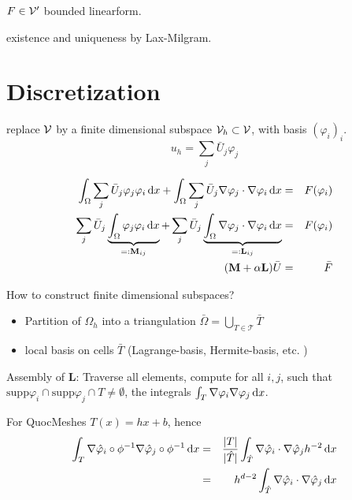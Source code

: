 $F\in {\mathcal V}'$ bounded linearform.

existence and uniqueness by Lax-Milgram.

\section{Discretization}

replace ${\mathcal V}$ by a finite dimensional subspace ${\mathcal V}_h \subset {\mathcal V}$, with basis $(\varphi_i)_i$.
\begin{equation}
u_h = \sum_j \bar U_j \varphi_j
\end{equation}

\begin{eqnarray*}
\int_\Omega \sum_j \bar U_j \varphi_j \varphi_i \,\mathrm{d}x + \int_\Omega\sum_j \bar U_j \nabla \varphi_j \cdot \nabla \varphi_i \,\mathrm{d}x  & = & F(\varphi_i)  \\
 \sum_j \bar U_j \underbrace{\int_\Omega \varphi_j \varphi_i \,\mathrm{d}x}_{=: \mathbf{M}_{ij}} + \sum_j \bar U_j \underbrace{\int_\Omega\nabla \varphi_j \cdot \nabla \varphi_i \,\mathrm{d}x}_{=:\mathbf{L}_{ij}}  & = & F(\varphi_i) \\
(\mathbf{M} + \alpha \mathbf{L}) \bar U &=& \bar F
\end{eqnarray*}

How to construct finite dimensional subspaces?

\begin{itemize}
\item Partition of $\Omega_h$ into a triangulation $\bar \Omega = \bigcup_{T\in \mathcal{T}} \bar T $
\item local basis on cells $\bar T$ (Lagrange-basis, Hermite-basis, etc. )
\end{itemize}


%

Assembly of $\mathbf{L}$: Traverse all elements, compute for all
$i, j$, such that $\mathrm{supp} \varphi_i \cap \mathrm{supp} \varphi_j \cap T \neq \emptyset$, the integrals $\int_T \nabla \varphi_i \nabla \varphi_j \,\mathrm{d}x$.

For QuocMeshes $T(x) = h x + b$, hence
\begin{eqnarray*}
\int_T \nabla \hat \varphi_i\circ \phi^{-1} \nabla \hat \varphi_j\circ\phi^{-1}\,\mathrm{d}x & = &
\frac{|T|}{|\hat T|} \int_{\hat T} \nabla \hat \varphi_i \cdot \nabla  \hat \varphi_j h^{-2}\,\mathrm{d}x \\
& =  & h^{d-2} \int_{\hat T} \nabla \hat \varphi_i \cdot \nabla  \hat \varphi_j\,\mathrm{d}x
\end{eqnarray*}

